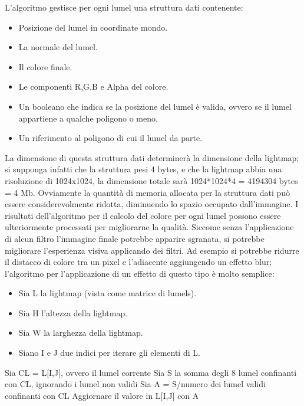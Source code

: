 L’algoritmo gestisce per ogni lumel una struttura dati contenente:
\begin{itemize}
\item Posizione del lumel in coordinate mondo.
\item La normale del lumel.
\item Il colore finale.
\item Le componenti R,G.B e Alpha del colore.
\item Un booleano che indica se la posizione del lumel è valida, ovvero se il lumel appartiene a qualche poligono o meno.
\item Un riferimento al poligono di cui il lumel da parte. 
\end{itemize}
La dimensione di questa struttura dati determinerà la dimensione della lightmap; si supponga infatti che la struttura pesi 4 bytes, e che la lightmap abbia una risoluzione di 1024x1024, la dimensione totale sarà 1024*1024*4 = 4194304 bytes = 4 Mb. Ovviamente la quantità di memoria allocata per la struttura dati può essere considerevolmente ridotta, diminuendo lo spazio occupato dall’immagine.
I risultati dell’algoritmo per il calcolo del colore per ogni lumel possono essere ulteriormente processati per migliorarne la qualità.
Siccome senza l’applicazione di alcun filtro l’immagine finale potrebbe apparire sgranata, si potrebbe migliorare l’esperienza visiva applicando dei filtri. 
Ad esempio si potrebbe ridurre il distacco di colore tra un pixel e l’adiacente aggiungendo un effetto blur; l’algoritmo per l’applicazione di un effetto di questo tipo è molto semplice:


\begin{itemize}
\item Sia L la lightmap (vista come matrice di lumels).
\item Sia H l'altezza della lightmap.
\item Sia W la larghezza della lightmap.
\item Siano I e J due indici per iterare gli elementi di L.
\end{itemize}
 
\begin{algorithm}[H]
  {
   { 
    Sia CL = L[I,J], ovvero il lumel corrente\;
    Sia S la somma degli 8 lumel confinanti con CL, ignorando i lumel non validi\;
    Sia A = S/numero dei lumel validi confinanti con CL\;
    Aggiornare il valore in L[I,J] con A\;
   }
  }
\end{algorithm}


